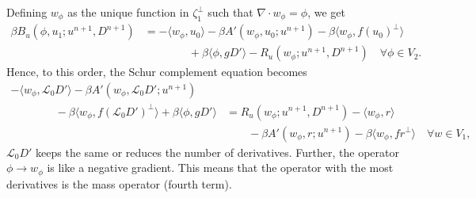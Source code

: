 \documentclass{article}
\begin{document}
Defining $w_\phi$ as the unique function in $\zeta_1^{\perp}$ such
that $\nabla\cdot w_\phi=\phi$, we get
\begin{align}
  \nonumber
  \beta B_u(\phi, u_1; u^{n+1},D^{n+1})
  & = 
  -\langle w_{\phi}, u_0 \rangle - \beta A'(w_\phi, u_0; u^{n+1})
  - \beta\langle w_\phi, f(u_0)^{\perp}\rangle \\
  & \qquad\qquad
  + \beta\langle \phi, gD'\rangle
  -R_u(w_\phi;u^{n+1},D^{n+1})
  \quad \forall \phi \in V_2.
\end{align}
Hence, to this order, the Schur complement equation becomes
\begin{align}
  \nonumber
  -\langle w_{\phi}, \mathcal{L}_0D' \rangle 
  - \beta A'(w_\phi, \mathcal{L}_0D'; u^{n+1}) & \\
  \nonumber
\qquad  \qquad   - \beta\langle w_\phi, f(\mathcal{L}_0D')^{\perp}\rangle
  + \beta\langle \phi, gD'\rangle
  &= R_u(w_\phi;u^{n+1},D^{n+1})
  -\langle w_{\phi}, r \rangle  \\
  & \qquad -\beta A'(w_\phi, r; u^{n+1})
  - \beta\langle w_\phi, fr^{\perp}\rangle
  \quad \forall w \in V_1,
\end{align}
$\mathcal{L}_0D'$ keeps the same or reduces the number of derivatives.
Further, the operator $\phi\to w_\phi$ is like a negative gradient.
This means that the operator with the most derivatives is the
mass operator (fourth term).
\end{document}
